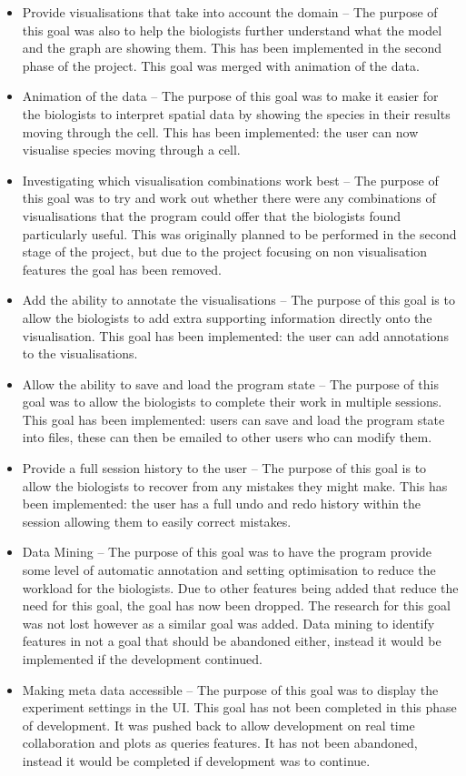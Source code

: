 \begin{itemize}
\item Provide visualisations that take into account the domain -- The purpose of this goal was also to help the biologists further understand what the model and the graph are showing them. This has been implemented in the second phase of the project.  This goal was merged with animation of the data.
\item Animation of the data -- The purpose of this goal was to make it easier for the biologists to interpret spatial data by showing the species in their results moving through the cell.  This has been implemented: the user can now visualise species moving through a cell.
\item Investigating which visualisation combinations work best -- The purpose of this goal was to try and work out whether there were any combinations of visualisations that the program could offer that the biologists found particularly useful.  This was originally planned to be performed in the second stage of the project, but due to the project focusing on non visualisation features the goal has been removed.
\item Add the ability to annotate the visualisations -- The purpose of this goal is to allow the biologists to add extra supporting information directly onto the visualisation. This goal has been implemented: the user can add annotations to the visualisations.
\item Allow the ability to save and load the program state -- The purpose of this goal was to allow the biologists to complete their work in multiple sessions. This goal has been implemented: users can save and load the program state into files, these can then be emailed to other users who can modify them.
\item Provide a full session history to the user -- The purpose of this goal is to allow the biologists to recover from any mistakes they might make. This has been implemented: the user has a full undo and redo history within the session allowing them to easily correct mistakes.
\item Data Mining -- The purpose of this goal was to have the program provide some level of automatic annotation and setting optimisation to reduce the workload for the biologists.  Due to other features being added that reduce the need for this goal, the goal has now been dropped.  The research for this goal was not lost however as a similar goal was added.  Data mining to identify features in not a goal that should be abandoned either, instead it would be implemented if the development continued.
\item Making meta data accessible -- The purpose of this goal was to display the experiment settings in the \ac{UI}.  This goal has not been completed in this phase of development.  It was pushed back to allow development on real time collaboration and plots as queries features.  It has not been abandoned, instead it would be completed if development was to continue.
\end{itemize}

